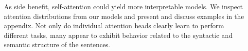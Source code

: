 As side benefit, self-attention could yield more interpretable models. We inspect attention distributions from our models and present and discuss examples in the appendix. Not only do individual attention heads clearly learn to perform different tasks, many appear to exhibit behavior related to the syntactic and semantic structure of the sentences.

